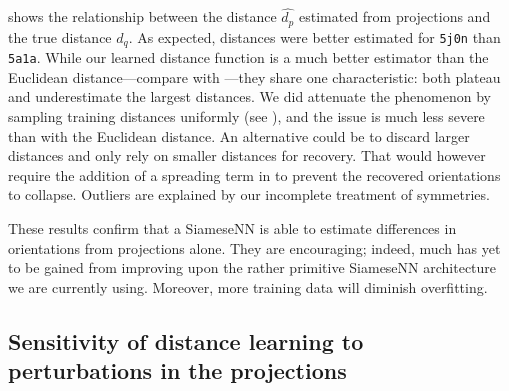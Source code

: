
 shows the relationship between the distance $\widehat{d_p}$ estimated from projections and the true distance $d_q$.
As expected, distances were better estimated for \texttt{5j0n} than \texttt{5a1a}.
While our learned distance function is a much better estimator than the Euclidean distance---compare  with ---they share one characteristic: both plateau and underestimate the largest distances.
We did attenuate the phenomenon by sampling training distances uniformly (see ), and the issue is much less severe than with the Euclidean distance.
An alternative could be to discard larger distances and only rely on smaller distances for recovery.
That would however require the addition of a spreading term in  to prevent the recovered orientations to collapse.
Outliers are explained by our incomplete treatment of symmetries.

These results confirm that a SiameseNN is able to estimate differences in orientations from projections alone.
They are encouraging; indeed, much has yet to be gained from improving upon the rather primitive SiameseNN architecture we are currently using.
Moreover, more training data will diminish overfitting.


\subsection{Sensitivity of distance learning to perturbations in the projections}\label{sec:results:distance-estimation:sensitivity}

